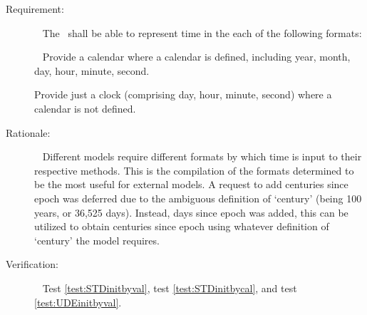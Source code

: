 \label{reqt:formattimerepresentation}
\begin{description}
  \item[Requirement:]\ \newline
    The \timeDesc\ shall be able to represent time in the 
    each of the following formats:

    \ \newline
      Provide a calendar where a calendar is defined, including year, month, 
      day, hour, minute, second.
      
      Provide just a clock (comprising day, hour, minute, second) where a 
      calendar is not defined.
  \item[Rationale:]\ \newline
    Different models require different formats by which time is input to their 
    respective methods.  This is the compilation of the formats determined to 
    be the most useful for external models.  A request to add centuries since 
    epoch was deferred due to the ambiguous definition of `century' (being 100 
    years, or 36,525 days).  Instead, days since epoch was added, this can be 
    utilized to obtain centuries since epoch using whatever definition of 
    `century' the model requires.
  \item[Verification:]\ \newline
    Test \vref{test:STDinitbyval}, test \vref{test:STDinitbycal}, and test 
    \vref{test:UDEinitbyval}.
\end{description}


